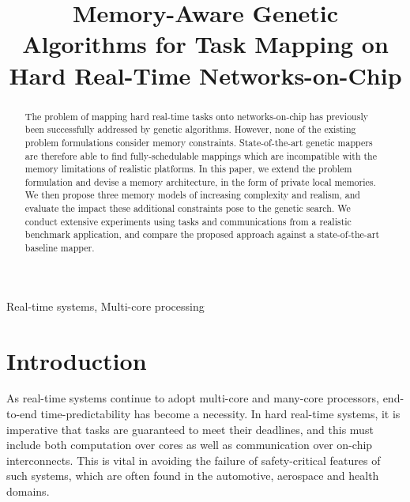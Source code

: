 \documentclass[10pt,conference]{IEEEtran}
\begin{document}
\title{Memory-Aware Genetic Algorithms for Task Mapping on Hard Real-Time Networks-on-Chip}

\author{
}

\maketitle

\begin{abstract}
The problem of mapping hard real-time tasks onto networks-on-chip has previously been successfully addressed by genetic algorithms. However, none of the existing problem formulations consider memory constraints. State-of-the-art genetic mappers are therefore able to find fully-schedulable mappings which are incompatible with the memory limitations of realistic platforms. In this paper, we extend the problem formulation and devise a memory architecture, in the form of private local memories. We then propose three memory models of increasing complexity and realism, and evaluate the impact these additional constraints pose to the genetic search. We conduct extensive experiments using tasks and communications from a realistic benchmark application, and compare the proposed approach against a state-of-the-art baseline mapper.
\end{abstract}

\begin{IEEEkeywords}
Real-time systems, Multi-core processing
\end{IEEEkeywords}

\section{Introduction}\label{sec:introduction}

As real-time systems continue to adopt multi-core and many-core processors, end-to-end time-predictability has become a necessity. In hard real-time systems, it is imperative that tasks are guaranteed to meet their deadlines, and this must include both computation over cores as well as communication over on-chip interconnects. This is vital in avoiding the failure of safety-critical features of such systems, which are often found in the automotive, aerospace and health domains.
\end{document}
